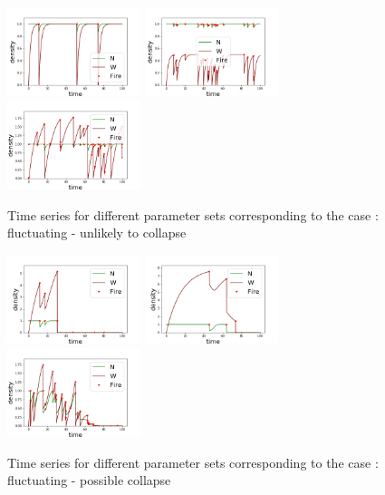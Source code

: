 \documentclass{article}
\begin{document}
\begin{figure}[h!]
\centering
\includegraphics[width=3.9cm]{equivalent_low_never_1.png}
\includegraphics[width=3.9cm]{equivalent_low_never_2.png}
\includegraphics[width=3.9cm]{equivalent_low_never_3.png}
\caption{Time series for different parameter sets corresponding to the case : fluctuating - unlikely to collapse}
\end{figure}



\begin{figure}[h!]
\centering
\includegraphics[width=3.9cm]{equivalent_low_always_1.png}
\includegraphics[width=3.9cm]{equivalent_low_always_2.png}
\includegraphics[width=3.9cm]{equivalent_low_always_3.png}
\caption{Time series for different parameter sets corresponding to the case : fluctuating - possible collapse}
\end{figure}
\end{document}

